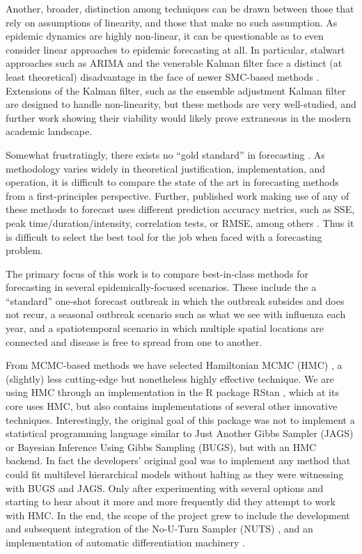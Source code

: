 Another, broader, distinction among techniques can be drawn between those that rely on assumptions of linearity, and those that make no such assumption. As epidemic dynamics are highly non-linear, it can be questionable as to even consider linear approaches to epidemic forecasting at all. In particular, stalwart approaches such as ARIMA and the venerable Kalman filter face a distinct (at least theoretical) disadvantage in the face of newer SMC-based methods \cite{Sugihara1994}\cite{Yang2014}. Extensions of the Kalman filter, such as the ensemble adjustment Kalman filter are designed to handle non-linearity, but these methods are very well-studied, and further work showing their viability would likely prove extraneous in the modern academic landscape.

Somewhat frustratingly, there exists no ``gold standard'' in forecasting \cite{Chretien2014}\cite{Nsoesie2014}\cite{Yang2014}. As methodology varies widely in theoretical justification, implementation, and operation, it is difficult to compare the state of the art in forecasting methods from a first-principles perspective. Further, published work making use of any of these methods to forecast uses different prediction accuracy metrics, such as SSE, peak time/duration/intensity, correlation tests, or RMSE, among others \cite{Chretien2014}\cite{Nsoesie2013}. Thus it is difficult to select the best tool for the job when faced with a forecasting problem.

The primary focus of this work is to compare best-in-class methods for forecasting in several epidemically-focused scenarios. These include the a ``standard'' one-shot forecast outbreak in which the outbreak subsides and does not recur, a seasonal outbreak scenario such as what we see with influenza each year, and a spatiotemporal scenario in which multiple spatial locations are connected and disease is free to spread from one to another.

From MCMC-based methods we have selected Hamiltonian MCMC (HMC) \cite{Neal2011}, a (slightly) less cutting-edge but nonetheless highly effective technique. We are using HMC through an implementation in the R package RStan \cite{Carpenter2016}, which at its core uses HMC, but also contains implementations of several other innovative techniques. Interestingly, the original goal of this package was not to implement a statistical programming language similar to Just Another Gibbs Sampler (JAGS) or Bayesian Inference Using Gibbs Sampling (BUGS), but with an HMC backend. In fact the developers' original goal was to implement any method that could fit multilevel hierarchical models without halting as they were witnessing with BUGS and JAGS. Only after experimenting with several options and starting to hear about it more and more frequently did they attempt to work with HMC. In the end, the scope of the project grew to include the development and subsequent integration of the No-U-Turn Sampler (NUTS) \cite{Hoffman2014}, and an implementation of automatic differentiation machinery \cite{StanDevelopmentTeam2015}.

